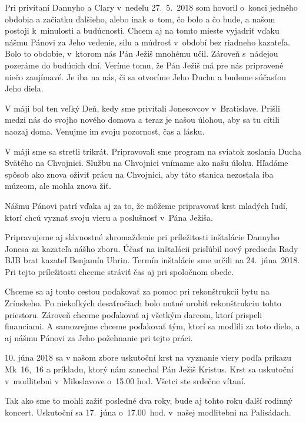 

Pri privítaní Dannyho a Clary v~nedeľu 27.~5.~2018 som hovoril o~konci jedného obdobia a začiatku ďalšieho, alebo inak o~tom, čo bolo a čo bude, a našom postoji k~minulosti a budúcnosti. Chcem aj na tomto mieste vyjadriť vďaku nášmu Pánovi za Jeho vedenie, silu a múdrosť v~období bez riadneho kazateľa. Bolo to obdobie, v~ktorom nás Pán Ježiš mnohému učil. Zároveň s~nádejou pozeráme do budúcich dní. Veríme tomu, že Pán Ježiš má pre nás pripravené niečo zaujímavé. Je iba na nás, či sa otvoríme Jeho Duchu a budeme súčasťou Jeho diela.

V máji bol ten veľký Deň, kedy sme privítali Jonesovcov v~Bratislave. Prišli medzi nás do svojho nového domova a teraz je našou úlohou, aby sa tu cítili naozaj doma. Venujme im svoju pozornosť, čas a lásku.

V máji sme sa stretli trikrát. Pripravovali sme program na sviatok zoslania Ducha Svätého na Chvojnici. Službu na Chvojnici vnímame ako našu úlohu. Hľadáme spôsob ako znova oživiť prácu na Chvojnici, aby táto stanica nezostala iba múzeom, ale mohla znova žiť.

Nášmu Pánovi patrí vďaka aj za to, že môžeme pripravovať krst mladých ľudí, ktorí chcú vyznať svoju vieru a poslušnosť v~Pána Ježiša.

Pripravujeme aj slávnostné zhromaždenie pri príležitosti inštalácie Dannyho Jonesa za kazateľa nášho zboru. Účasť na inštalácii prisľúbil nový predseda Rady BJB brat kazateľ Benjamín Uhrin. Termín inštalácie sme určili na 24.~júna~2018. Pri tejto príležitosti chceme stráviť čas aj pri spoločnom obede.

Chceme sa aj touto cestou poďakovať za pomoc pri rekonštrukcii bytu na Zrínskeho. Po niekoľkých desaťročiach bolo nutné urobiť rekonštrukciu tohto priestoru. Zároveň chceme poďakovať aj všetkým darcom, ktorí prispeli financiami. A samozrejme chceme poďakovať tým, ktorí sa modlili za toto dielo, a aj nášmu Pánovi za Jeho požehnanie pri tejto práci.



10. júna 2018 sa v našom zbore uskutoční krst na vyznanie viery podľa príkazu Mk~16,~16 a príkladu, ktorý nám zanechal Pán Ježiš Kristus. Krst sa uskutoční v~modlitebni v~Miloslavove o~15.00 hod. Všetci ste srdečne vítaní.


Tak ako sme to mohli zažiť posledné dva roky, bude aj tohto roku ďalší rodinný koncert. Uskutoční sa 17.~júna o~17.00~hod. v~našej modlitebni na Palisádach.

